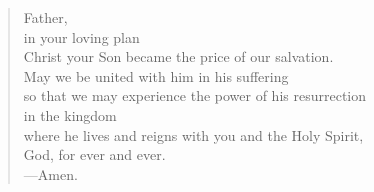 \prayer

\setlength{\vleftmargin}{\prayerleftmargini}

\begin{verse}
Father,\\
in your loving plan\\
Christ your Son became the price of our salvation.\\
May we be united with him in his suffering\\
so that we may experience the power of his resurrection\\
in the kingdom\\
where he lives and reigns with you and the Holy Spirit,\\
God, for ever and ever.\\
{\color{red}---\thinspace}Amen.
\end{verse}

\setlength{\vleftmargin}{\defleftmargini}